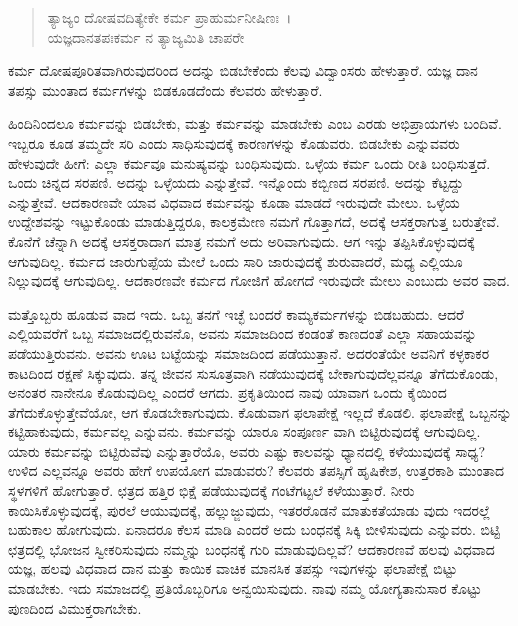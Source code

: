 \begin{verse}
ತ್ಯಾಜ್ಯಂ ದೋಷವದಿತ್ಯೇಕೇ ಕರ್ಮ ಪ್ರಾಹುರ್ಮನೀಷಿಣಃ~।\\ಯಜ್ಞದಾನತಪಃಕರ್ಮ ನ ತ್ಯಾಜ್ಯಮಿತಿ ಚಾಪರೇ 
\end{verse}

{\small ಕರ್ಮ ದೋಷಪೂರಿತವಾಗಿರುವುದರಿಂದ ಅದನ್ನು ಬಿಡಬೇಕೆಂದು ಕೆಲವು ವಿದ್ವಾಂಸರು ಹೇಳುತ್ತಾರೆ. ಯಜ್ಞ ದಾನ ತಪಸ್ಸು ಮುಂತಾದ ಕರ್ಮಗಳನ್ನು ಬಿಡಕೂಡದೆಂದು ಕೆಲವರು ಹೇಳುತ್ತಾರೆ.}

ಹಿಂದಿನಿಂದಲೂ ಕರ್ಮವನ್ನು ಬಿಡಬೇಕು, ಮತ್ತು ಕರ್ಮವನ್ನು ಮಾಡಬೇಕು ಎಂಬ ಎರಡು ಅಭಿಪ್ರಾಯಗಳು ಬಂದಿವೆ. ಇಬ್ಬರೂ ಕೂಡ ತಮ್ಮದೇ ಸರಿ ಎಂದು ಸಾಧಿಸುವುದಕ್ಕೆ ಕಾರಣಗಳನ್ನು ಕೊಡುವರು. ಬಿಡಬೇಕು ಎನ್ನುವವರು ಹೇಳುವುದೇ ಹೀಗೆ: ಎಲ್ಲಾ ಕರ್ಮವೂ ಮನುಷ್ಯವನ್ನು ಬಂಧಿಸುವುದು. ಒಳ್ಳೆಯ ಕರ್ಮ ಒಂದು ರೀತಿ ಬಂಧಿಸುತ್ತದೆ. ಒಂದು ಚಿನ್ನದ ಸರಪಣಿ. ಅದನ್ನು ಒಳ್ಳೆಯದು ಎನ್ನುತ್ತೇವೆ. ಇನ್ನೊಂದು ಕಬ್ಬಿಣದ ಸರಪಣಿ. ಅದನ್ನು ಕೆಟ್ಟದ್ದು ಎನ್ನುತ್ತೇವೆ. ಆದಕಾರಣವೇ ಯಾವ ವಿಧವಾದ ಕರ್ಮವನ್ನು ಕೂಡಾ ಮಾಡದೆ ಇರುವುದೇ ಮೇಲು. ಒಳ್ಳೆಯ ಉದ್ದೇಶವನ್ನು ಇಟ್ಟುಕೊಂಡು ಮಾಡುತ್ತಿದ್ದರೂ, ಕಾಲಕ್ರಮೇಣ ನಮಗೆ ಗೊತ್ತಾಗದೆ, ಅದಕ್ಕೆ ಆಸಕ್ತರಾಗುತ್ತ ಬರುತ್ತೇವೆ. ಕೊನೆಗೆ ಚೆನ್ನಾಗಿ ಅದಕ್ಕೆ ಆಸಕ್ತರಾದಾಗ ಮಾತ್ರ ನಮಗೆ ಅದು ಅರಿವಾಗುವುದು. ಆಗ ಇನ್ನು ತಪ್ಪಿಸಿಕೊಳ್ಳುವುದಕ್ಕೆ ಆಗುವುದಿಲ್ಲ. ಕರ್ಮದ ಜಾರುಗುಪ್ಪೆಯ ಮೇಲೆ ಒಂದು ಸಾರಿ ಜಾರುವುದಕ್ಕೆ ಶುರುವಾದರೆ, ಮಧ್ಯ ಎಲ್ಲಿಯೂ ನಿಲ್ಲುವುದಕ್ಕೆ ಆಗುವುದಿಲ್ಲ. ಆದಕಾರಣವೇ ಕರ್ಮದ ಗೋಜಿಗೆ ಹೋಗದೆ ಇರುವುದೇ ಮೇಲು ಎಂಬುದು ಅವರ ವಾದ.

ಮತ್ತೊಬ್ಬರು ಹೂಡುವ ವಾದ ಇದು. ಒಬ್ಬ ತನಗೆ ಇಚ್ಛೆ ಬಂದರೆ ಕಾಮ್ಯಕರ್ಮಗಳನ್ನು ಬಿಡಬಹುದು. ಆದರೆ ಎಲ್ಲಿಯವರೆಗೆ ಒಬ್ಬ ಸಮಾಜದಲ್ಲಿರುವನೊ, ಅವನು ಸಮಾಜದಿಂದ ಕಂಡಂತೆ ಕಾಣದಂತೆ ಎಲ್ಲಾ ಸಹಾಯವನ್ನು ಪಡೆಯುತ್ತಿರುವನು. ಅವನು ಊಟ ಬಟ್ಟೆಯನ್ನು ಸಮಾಜದಿಂದ ಪಡೆಯುತ್ತಾನೆ. ಅದರಂತೆಯೇ ಅವನಿಗೆ ಕಳ್ಳಕಾಕರ ಕಾಟದಿಂದ ರಕ್ಷಣೆ ಸಿಕ್ಕುವುದು. ತನ್ನ ಜೀವನ ಸುಸೂತ್ರವಾಗಿ ನಡೆಯುವುದಕ್ಕೆ ಬೇಕಾಗುವುದೆಲ್ಲವನ್ನೂ ತೆಗೆದುಕೊಂಡು, ಅನಂತರ ನಾನೇನೂ ಕೊಡುವುದಿಲ್ಲ ಎಂದರೆ ಆಗದು. ಪ್ರಕೃತಿಯಿಂದ ನಾವು ಯಾವಾಗ ಒಂದು ಕೈಯಿಂದ ತೆಗೆದುಕೊಳ್ಳುತ್ತೇವೆಯೋ, ಆಗ ಕೊಡಬೇಕಾಗುವುದು. ಕೊಡುವಾಗ ಫಲಾಪೇಕ್ಷೆ ಇಲ್ಲದೆ ಕೊಡಲಿ. ಫಲಾಪೇಕ್ಷೆ ಒಬ್ಬನನ್ನು ಕಟ್ಟಿಹಾಕುವುದು, ಕರ್ಮವಲ್ಲ ಎನ್ನುವನು. ಕರ್ಮವನ್ನು ಯಾರೂ ಸಂಪೂರ್ಣ ವಾಗಿ ಬಿಟ್ಟಿರುವುದಕ್ಕೆ ಆಗುವುದಿಲ್ಲ. ಯಾರು ಕರ್ಮವನ್ನು ಬಿಟ್ಟಿರುವೆವು ಎನ್ನುತ್ತಾರೆಯೊ, ಅವರು ಎಷ್ಟು ಕಾಲವನ್ನು ಧ್ಯಾನದಲ್ಲಿ ಕಳೆಯುವುದಕ್ಕೆ ಸಾಧ್ಯ? ಉಳಿದ ಎಲ್ಲವನ್ನೂ ಅವರು ಹೇಗೆ ಉಪಯೋಗ ಮಾಡುವರು? ಕೆಲವರು ತಪಸ್ಸಿಗೆ ಹೃಷಿಕೇಶ, ಉತ್ತರಕಾಶಿ ಮುಂತಾದ ಸ್ಥಳಗಳಿಗೆ ಹೋಗುತ್ತಾರೆ. ಛತ್ರದ ಹತ್ತಿರ ಭಿಕ್ಷೆ ಪಡೆಯುವುದಕ್ಕೆ ಗಂಟೆಗಟ್ಟಲೆ ಕಳೆಯುತ್ತಾರೆ. ನೀರು ಕಾಯಿಸಿಕೊಳ್ಳುವುದಕ್ಕೆ, ಪುರಲೆ ಆಯುವುದಕ್ಕೆ, ಹಲ್ಲುಜ್ಜುವುದು, ಇತರರೊಡನೆ ಮಾತುಕತೆಯಾಡು ವುದು ಇದರಲ್ಲೆ ಬಹುಕಾಲ ಹೋಗುವುದು. ಏನಾದರೂ ಕೆಲಸ ಮಾಡಿ ಎಂದರೆ ಅದು ಬಂಧನಕ್ಕೆ ಸಿಕ್ಕಿ ಬೀಳಿಸುವುದು ಎನ್ನುವರು. ಬಿಟ್ಟಿ ಛತ್ರದಲ್ಲಿ ಭೋಜನ ಸ್ವೀಕರಿಸುವುದು ನಮ್ಮನ್ನು ಬಂಧನಕ್ಕೆ ಗುರಿ ಮಾಡುವುದಿಲ್ಲವೆ? ಆದಕಾರಣವೆ ಹಲವು ವಿಧವಾದ ಯಜ್ಞ, ಹಲವು ವಿಧವಾದ ದಾನ ಮತ್ತು ಕಾಯಿಕ ವಾಚಿಕ ಮಾನಸಿಕ ತಪಸ್ಸು ಇವುಗಳನ್ನು ಫಲಾಪೇಕ್ಷೆ ಬಿಟ್ಟು ಮಾಡಬೇಕು. ಇದು ಸಮಾಜದಲ್ಲಿ ಪ್ರತಿಯೊಬ್ಬರಿಗೂ ಅನ್ವಯಿಸುವುದು. ನಾವು ನಮ್ಮ ಯೋಗ್ಯತಾನುಸಾರ ಕೊಟ್ಟು ಪುಣದಿಂದ ವಿಮುಕ್ತರಾಗಬೇಕು.

